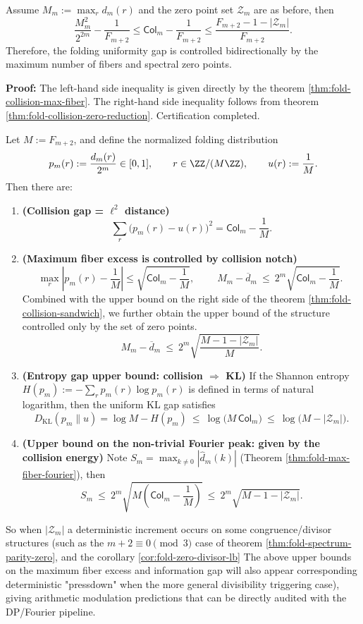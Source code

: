 \begin{theorem}
\label{thm:fold-collision-sandwich}
Assume $M_m:=\max_r d_m(r)$ and the zero point set $\mathcal{Z}_m$ are as before, then
\[
\frac{M_m^2}{2^{2m}}-\frac{1}{F_{m+2}}
\le
\mathsf{Col}_m-\frac{1}{F_{m+2}}
\le
\frac{F_{m+2}-1-|\mathcal{Z}_m|}{F_{m+2}}.
\]
Therefore, the folding uniformity gap is controlled bidirectionally by the maximum number of fibers and spectral zero points.
\end{theorem}

\textbf{Proof:}
The left-hand side inequality is given directly by the theorem \ref{thm:fold-collision-max-fiber}.
The right-hand side inequality follows from theorem \ref{thm:fold-collision-zero-reduction}. Certification completed.

\begin{theorem}\label{thm:fold-zero-uncertainty}
Let \(M:=F_{m+2}\), and define the normalized folding distribution
\[
p_m(r):=\frac{d_m(r)}{2^m}\in[0,1],\qquad r\in\ZZ/(M\ZZ),
\qquad
u(r):=\frac{1}{M}.
\]
Then there are:
\begin{enumerate}
\item \textbf{(Collision gap = \(\ell^2\) distance)}
  \[
  \boxed{\;\sum_{r}\bigl(p_m(r)-u(r)\bigr)^2=\mathsf{Col}_m-\frac{1}{M}.\;}
  \]
\item \textbf{(Maximum fiber excess is controlled by collision notch)}
  \[
  \max_r\left|p_m(r)-\frac1M\right|
  \le \sqrt{\mathsf{Col}_m-\frac{1}{M}},
  \qquad
  \boxed{\;
  M_m-\overline d_m\ \le\ 2^m\sqrt{\mathsf{Col}_m-\frac{1}{M}}.\;}
  \]
Combined with the upper bound on the right side of the theorem \ref{thm:fold-collision-sandwich}, we further obtain the upper bound of the structure controlled only by the set of zero points.
  \[
  \boxed{\;
  M_m-\overline d_m\ \le\ 2^m\sqrt{\frac{M-1-|\mathcal{Z}_m|}{M}}. \;}
  \]
\item \textbf{(Entropy gap upper bound: collision \(\Rightarrow\) KL)}
If the Shannon entropy \(H(p_m):=-\sum_r p_m(r)\log p_m(r)\) is defined in terms of natural logarithm, then the uniform KL gap satisfies
  \[
  D_{\mathrm{KL}}(p_m\|u)=\log M-H(p_m)\ \le\ \log\!\bigl(M\,\mathsf{Col}_m\bigr)\ \le\ \log\!\bigl(M-|\mathcal{Z}_m|\bigr).
  \]
\item \textbf{(Upper bound on the non-trivial Fourier peak: given by the collision energy)}
Note \(S_m=\max_{k\ne 0}|\widehat d_m(k)|\) (Theorem \ref{thm:fold-max-fiber-fourier}), then
  \[
  \boxed{\;
  S_m\ \le\ 2^m\sqrt{M\left(\mathsf{Col}_m-\frac{1}{M}\right)}\ \le\ 2^m\sqrt{M-1-|\mathcal{Z}_m|}. \;}
  \]
\end{enumerate}
So when \(|\mathcal{Z}_m|\) a deterministic increment occurs on some congruence/divisor structures (such as the \(m+2\equiv 0\pmod 3\) case of theorem \ref{thm:fold-spectrum-parity-zero}, and the corollary \ref{cor:fold-zero-divisor-lb} The above upper bounds on the maximum fiber excess and information gap will also appear corresponding deterministic "pressdown" when the more general divisibility triggering case), giving arithmetic modulation predictions that can be directly audited with the DP/Fourier pipeline.
\end{theorem}
